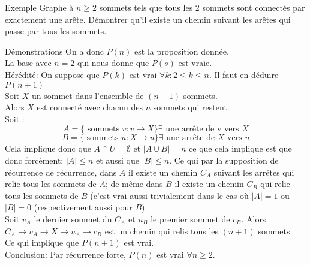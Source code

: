 \begin{parag}{Exemple}
    Graphe à $n \geq 2$ sommets tels que tous les 2 sommets sont connectés par exactement une arête. Démontrer qu'il existe un chemin suivant les arêtes qui passe par tous les sommets.
    \begin{subparag}{Démonstrations}
        On a donc $P\left(n\right)$ est la proposition donnée.\\
        La base avec $n = 2$ qui nous donne que $P\left(s\right)$ est vraie.\\
        Hérédité: On suppose que $P\left(k\right)$ est vrai $\forall k: 2 \leq k \leq n$. Il faut en déduire $P\left(n+1\right)$\\
        Soit $X$ un sommet dans l'ensemble de $\left(n+1\right)$ sommets.\\
        Alors $X$ est connecté avec chacun des $n$ sommets qui restent.\\
        Soit :
        \begin{equation*} A = \{ \text{ sommets } v: v \to X\} \exists \text{ une arrête de v vers } X \end{equation*}
    \begin{equation*} B = \{ \text{ sommets } u: X \to u\} \exists \text{ une arrête de } X \text{ vers } u \end{equation*}
    Cela implique donc que $A \cap U = \emptyset$ et $\left| A \cup B\right| = n$ ce que cela implique est que donc forcément: $\left|A\right| \leq n$ et aussi que $\left|B\right| \leq n$. Ce qui par la supposition de récurrence de récurrence, dans $A$ il existe un chemin $C_A$ suivant les arrêtes qui relie tous les sommets de $A$; de même dans $B$ il existe un chemin $C_B$ qui relie tous les sommets de $B$ (c'est vrai aussi trivialement dans le cas où $\left|A\right| = 1$ ou $\left|B\right| = 0$ (respectivement aussi pour $B$).\\
    Soit $v_A$ le dernier sommet du $C_A$ et $u_B$ le premier sommet de $c_B$. Alors $C_A \to v_A \to X \to u_A \to c_B$ est un chemin qui relis tous les $\left(n+1\right)$ sommets.\\
    Ce qui implique que $P\left(n+1\right)$ est vrai.\\
    Conclusion: Par récurrence forte, $P\left(n\right)$ est vrai $\forall n \geq 2$.

        
    \end{subparag}
    
\end{parag}

